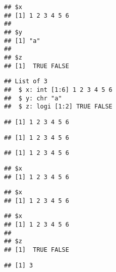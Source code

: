 \documentclass[paper=a4,10pt,div=17,headsepline,BCOR=12mm,twoside,open=right]{scrbook}\usepackage{knitr}
\begin{document}
\begin{knitrout}\footnotesize
{}\color{fgcolor}\begin{kframe}
\begin{alltt}
 \hlkwb{<-} \hlstd{(} \hlstd{=} \hlopt{:}\hlstd{,}  \hlstd{=} \hlstd{,}  \hlstd{=} \hlstd{(}\hlstd{,} \hlstd{))}
\end{alltt}
\begin{verbatim}
## $x
## [1] 1 2 3 4 5 6
## 
## $y
## [1] "a"
## 
## $z
## [1]  TRUE FALSE
\end{verbatim}
\begin{alltt}
\end{alltt}
\begin{verbatim}
## List of 3
##  $ x: int [1:6] 1 2 3 4 5 6
##  $ y: chr "a"
##  $ z: logi [1:2] TRUE FALSE
\end{verbatim}
\begin{alltt}
\hlopt{$}
\end{alltt}
\begin{verbatim}
## [1] 1 2 3 4 5 6
\end{verbatim}
\begin{alltt}
\hlstd{a.list[[}\hlstd{]]}
\end{alltt}
\begin{verbatim}
## [1] 1 2 3 4 5 6
\end{verbatim}
\begin{alltt}
\hlstd{a.list[[}\hlstd{]]}
\end{alltt}
\begin{verbatim}
## [1] 1 2 3 4 5 6
\end{verbatim}
\begin{alltt}
\hlstd{a.list[}\hlstd{]}
\end{alltt}
\begin{verbatim}
## $x
## [1] 1 2 3 4 5 6
\end{verbatim}
\begin{alltt}
\hlstd{a.list[}\hlstd{]}
\end{alltt}
\begin{verbatim}
## $x
## [1] 1 2 3 4 5 6
\end{verbatim}
\begin{alltt}
\hlstd{a.list[}\hlstd{(}\hlstd{,}\hlstd{)]}
\end{alltt}
\begin{verbatim}
## $x
## [1] 1 2 3 4 5 6
## 
## $z
## [1]  TRUE FALSE
\end{verbatim}
\begin{alltt}
\hlstd{(a.list[[}\hlstd{(}\hlstd{,}\hlstd{)]])}
\end{alltt}
\begin{verbatim}
## [1] 3
\end{verbatim}
\end{kframe}
\end{knitrout}
\end{document}
